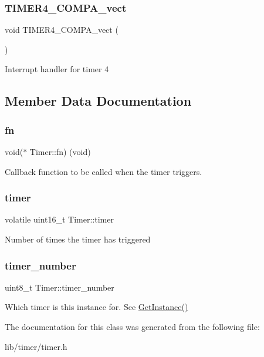 \subsubsection{\texorpdfstring{T\+I\+M\+E\+R4\+\_\+\+C\+O\+M\+P\+A\+\_\+vect}{TIMER4\_COMPA\_vect}}
{\footnotesize\ttfamily void T\+I\+M\+E\+R4\+\_\+\+C\+O\+M\+P\+A\+\_\+vect (\begin{DoxyParamCaption}{ }\end{DoxyParamCaption})\hspace{0.3cm}{\ttfamily [friend]}}

Interrupt handler for timer 4 

\subsection{Member Data Documentation}
\hypertarget{class_timer_af44fd5c977c119c25af6aeee6f7cdc7a}{}\label{class_timer_af44fd5c977c119c25af6aeee6f7cdc7a} 
\subsubsection{\texorpdfstring{fn}{fn}}
{\footnotesize\ttfamily void($\ast$ Timer\+::fn) (void)\hspace{0.3cm}{\ttfamily [private]}}

Callback function to be called when the timer triggers. \hypertarget{class_timer_abd1196c7069c046e192e936bfc264693}{}\label{class_timer_abd1196c7069c046e192e936bfc264693} 
\subsubsection{\texorpdfstring{timer}{timer}}
{\footnotesize\ttfamily volatile uint16\+\_\+t Timer\+::timer\hspace{0.3cm}{\ttfamily [private]}}

Number of times the timer has triggered \hypertarget{class_timer_a3c813be60ee224a8d6b252a83dfe16d3}{}\label{class_timer_a3c813be60ee224a8d6b252a83dfe16d3} 
\subsubsection{\texorpdfstring{timer\+\_\+number}{timer\_number}}
{\footnotesize\ttfamily uint8\+\_\+t Timer\+::timer\+\_\+number\hspace{0.3cm}{\ttfamily [private]}}

Which timer is this instance for. See \hyperlink{class_timer_a5a9960ef2a5394a76b4b024cae1a86a3}{Get\+Instance()} 

The documentation for this class was generated from the following file\+:\begin{DoxyCompactItemize}
\item 
lib/timer/timer.\+h\end{DoxyCompactItemize}

